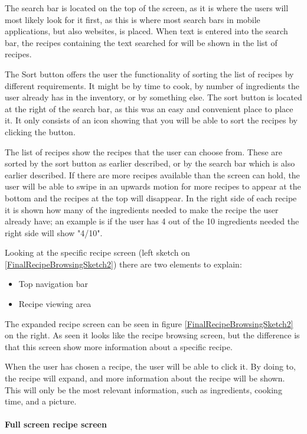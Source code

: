 The search bar is located on the top of the screen, as it is where the users will most likely look for it first, as this is where most search bars in mobile applications, but also websites, is placed. When text is entered into the search bar, the recipes containing the text searched for will be shown in the list of recipes. 

The Sort button offers the user the functionality of sorting the list of recipes by different requirements. It might be by time to cook, by number of ingredients the user already has in the inventory, or by something else. The sort button is located at the right of the search bar, as this was an easy and convenient place to place it. It only consists of an icon showing that you will be able to sort the recipes by clicking the button.

The list of recipes show the recipes that the user can choose from. These are sorted by the sort button as earlier described, or by the search bar which is also earlier described. If there are more recipes available than the screen can hold, the user will be able to swipe in an upwards motion for more recipes to appear at the bottom and the recipes at the top will disappear. In the right side of each recipe it is shown how many of the ingredients needed to make the recipe the user already have; an example is if the user has 4 out of the 10 ingredients needed the right side will show "4/10".

Looking at the specific recipe screen (left sketch on \cref{FinalRecipeBrowsingSketch2}) there are two elements to explain:

\begin{itemize}
\item Top navigation bar
\item Recipe viewing area
\end{itemize} 

The expanded recipe screen can be seen in figure \ref{FinalRecipeBrowsingSketch2} on the right. As seen it looks like the recipe browsing screen, but the difference is that this screen show more information about a specific recipe.

When the user has chosen a recipe, the user will be able to click it. By doing to, the recipe will expand, and more information about the recipe will be shown. This will only be the most relevant information, such as ingredients, cooking time, and a picture.

\paragraph{Full screen recipe screen}

